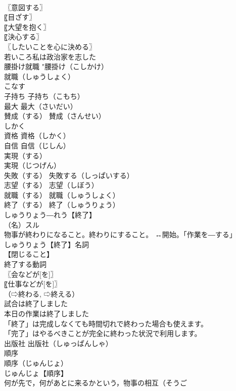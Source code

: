 \documentclass[8pt]{extreport}
\begin{document}
\begin{CJK}{UTF8}{min}
\\	〖意図する〗
\\	〖目ざす〗
\\	〖大望を抱く〗
\\	〖決心する〗
\\	〖したいことを心に決める〗
\\	若いころ私は政治家を志した
\\	腰掛け就職		"腰掛け（こしかけ）
\\	就職（しゅうしょく）
\\	こなす		
\\	子持ち		子持ち（こもち）
\\	最大		最大（さいだい）
\\	賛成（する）		賛成（さんせい）
\\	しかく
\\	資格		資格（しかく）
\\	自信		自信（じしん）
\\	実現（する）		
\\	実現（じつげん）
\\	失敗（する）		失敗する（しっぱいする）
\\	志望（する）		志望（しぼう）
\\	就職（する）		就職（しゅうしょく）
\\	終了（する）		終了（しゅうりょう）
\\	しゅうりょう―れう【終了】
\\	（名）スル
\\	物事が終わりになること。終わりにすること。 ↔開始。「作業を―する」
\\	しゅうりょう【終了】名詞
\\	【閉じること】
\\	終了する動詞
\\	〖会などが[を]〗
\\	〖仕事などが[を]〗
\\	（⇨終わる, ⇨終える）
\\	試合は終了しました
\\	本日の作業は終了しました
\\	「終了」は完成しなくても時間切れで終わった場合も使えます。
\\	「完了」はやるべきことが完全に終わった状況で利用します。
\\	出版社		出版社（しゅっぱんしゃ）
\\	順序
\\	順序（じゅんじょ）
\\	じゅんじょ【順序】
\\	何が先で，何があとに来るかという，物事の相互（そうご

\end{CJK}
\end{document}
